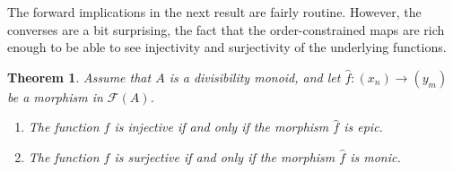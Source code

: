 \documentclass[reqno]{amsart}
\theoremstyle{plain}
\newtheorem{thm}[lem]{Theorem}
\theoremstyle{definition}
\numberwithin{equation}{lem}
\begin{document}
The forward implications in the next result are fairly routine.
However, the converses are a bit surprising, the fact that 
the order-constrained maps
are rich enough to be able to see injectivity and surjectivity of the underlying 
functions.

\begin{thm}
\label{epic_monic_theorem}
Assume that $A$ is a divisibility monoid, and let $\hat{f}\colon(x_n) \to (y_m)$ be a morphism in $\mathcal{F}(A)$. 
\begin{enumerate}[\rm(a)]
\item\label{item170423a}
The function $f$ is injective if and only if the morphism $\hat{f}$ is epic. 
\item\label{item170423b}
The function $f$ is surjective if and only if the morphism $\hat{f}$ is monic. 
\end{enumerate}
\end{thm}
\end{document}
